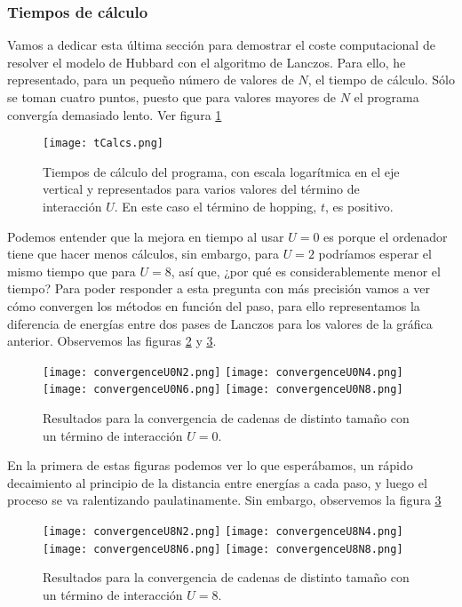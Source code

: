 \documentclass[12pt,twoside]{article}
\begin{document}
\subsubsection{Tiempos de cálculo}

Vamos a dedicar esta última sección para demostrar el coste computacional de resolver el modelo de Hubbard con el algoritmo de Lanczos. Para ello, he representado, para un pequeño número de valores de $N$, el tiempo de cálculo. Sólo se toman cuatro puntos, puesto que para valores mayores de $N$ el programa convergía demasiado lento. Ver figura \ref{fig:calcTimes}
\begin{figure}[h!]
  \begin{center}
    \texttt{[image: tCalcs.png]}
  \end{center}
  \caption{Tiempos de cálculo del programa, con escala logarítmica en el eje vertical y representados para varios valores del término de interacción $U$. En este caso el término de hopping, $t$, es positivo.}
  \label{fig:calcTimes}
\end{figure}

Podemos entender que la mejora en tiempo al usar $U=0$ es porque el ordenador tiene que hacer menos cálculos, sin embargo, para $U=2$ podríamos esperar el mismo tiempo que para $U=8$, así que, ¿por qué es considerablemente menor el tiempo? Para poder responder a esta pregunta con más precisión vamos a ver cómo convergen los métodos en función del paso, para ello representamos la diferencia de energías entre dos pases de Lanczos para los valores de la gráfica anterior. Observemos las figuras \ref{fig:convergenceGood} y \ref{fig:convergenceBad}.
\begin{figure}[h!]
  \begin{center}
    \texttt{[image: convergenceU0N2.png]}
    \texttt{[image: convergenceU0N4.png]}
    \texttt{[image: convergenceU0N6.png]}
    \texttt{[image: convergenceU0N8.png]}
  \end{center}
  \caption{Resultados para la convergencia de cadenas de distinto tamaño con un término de interacción $U = 0$.}
  \label{fig:convergenceGood}
\end{figure}

En la primera de estas figuras podemos ver lo que esperábamos, un rápido decaimiento al principio de la distancia entre energías a cada paso, y luego el proceso se va ralentizando paulatinamente. Sin embargo, observemos la figura \ref{fig:convergenceBad}
\begin{figure}
  \begin{center}
    \texttt{[image: convergenceU8N2.png]}
    \texttt{[image: convergenceU8N4.png]}
    \texttt{[image: convergenceU8N6.png]}
    \texttt{[image: convergenceU8N8.png]}
  \end{center}
  \caption{Resultados para la convergencia de cadenas de distinto tamaño con un término de interacción $U = 8$.}
  \label{fig:convergenceBad}
\end{figure}
\end{document}
